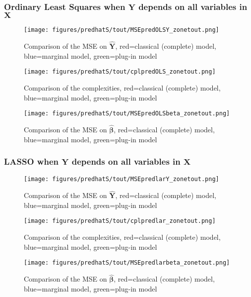 \documentclass[12pt,a4paper]{report}
\begin{document}
\subsubsection{Ordinary Least Squares when $\boldsymbol{Y}$ depends on all variables in $\boldsymbol{X}$}
	\begin{figure}[h!]
	\centering
		  \texttt{[image: figures/predhatS/tout/MSEpredOLSY\_zonetout.png]}
		\caption{Comparison of the MSE on $\hat{\boldsymbol{Y}}$, red=classical (complete) model, blue=marginal model, green=plug-in model}\label{MSEpredOLSY_zonetout}
	\end{figure}
	\begin{figure}[h!]
	\centering
		  \texttt{[image: figures/predhatS/tout/cplpredOLS\_zonetout.png]}
		\caption{Comparison of the complexities, red=classical (complete) model, blue=marginal model, green=plug-in model}\label{cplpredOLS_zonetout}
	\end{figure}
	\begin{figure}[h!]
	\centering
		  \texttt{[image: figures/predhatS/tout/MSEpredOLSbeta\_zonetout.png]}
		\caption{Comparison of the MSE on $\hat{\boldsymbol{\beta}}$, red=classical (complete) model, blue=marginal model, green=plug-in model}\label{MSEpredOLSbeta_zonetout}
	\end{figure}
	\FloatBarrier
\newpage
\subsubsection{LASSO when $\boldsymbol{Y}$ depends on all variables in $\boldsymbol{X}$}

	\begin{figure}[h!]
	\centering
		  \texttt{[image: figures/predhatS/tout/MSEpredlarY\_zonetout.png]}
		\caption{Comparison of the MSE on $\hat{\boldsymbol{Y}}$, red=classical (complete) model, blue=marginal model, green=plug-in model}\label{MSEpredlarY_zonetout}
	\end{figure}
	\begin{figure}[h!]
	\centering
		  \texttt{[image: figures/predhatS/tout/cplpredlar\_zonetout.png]}
		\caption{Comparison of the complexities, red=classical (complete) model, blue=marginal model, green=plug-in model}\label{cplpredlar_zonetout}
	\end{figure}
	\begin{figure}[h!]
	\centering
		  \texttt{[image: figures/predhatS/tout/MSEpredlarbeta\_zonetout.png]}
		\caption{Comparison of the MSE on $\hat{\boldsymbol{\beta}}$, red=classical (complete) model, blue=marginal model, green=plug-in model}\label{MSEpredlarbeta_zonetout}
	\end{figure}
	\FloatBarrier
\newpage
\end{document}
